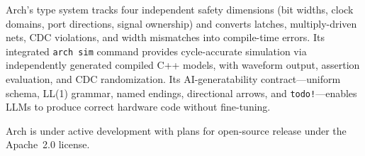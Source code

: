 \documentclass[11pt,twocolumn]{article}
\begin{document}
Arch's type system tracks four independent safety dimensions (bit widths, clock domains, port directions, signal ownership) and converts latches, multiply-driven nets, CDC violations, and width mismatches into compile-time errors.
Its integrated \texttt{arch sim} command provides cycle-accurate simulation via independently generated compiled C++ models, with waveform output, assertion evaluation, and CDC randomization.
Its AI-generatability contract---uniform schema, LL(1) grammar, named endings, directional arrows, and \texttt{todo!}---enables LLMs to produce correct hardware code without fine-tuning.

Arch is under active development with plans for open-source release under the Apache~2.0 license.


\end{document}
